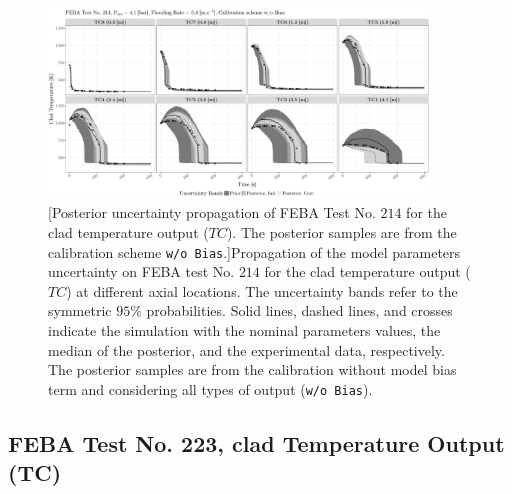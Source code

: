 \clearpage
\begin{figure}
	\centering
	\includegraphics[width=0.90\textwidth]{../figures/chapter5/figures/plotTraceUQPosteriorAllNoDiscNoBCTC214}
		[Posterior uncertainty propagation of FEBA Test No. $214$ for the clad temperature output ($TC$). The posterior samples are from the calibration scheme \texttt{w/o Bias}.]{Propagation of the model parameters uncertainty on FEBA test No. $214$ for the clad temperature output ($TC$) at different axial locations. The uncertainty bands refer to the symmetric $95\%$ probabilities. Solid lines, dashed lines, and crosses indicate the simulation with the nominal parameters values, the median of the posterior, and the experimental data, respectively. The posterior samples are from the calibration without model bias term and considering all types of output (\texttt{w/o Bias}).}
	\label{fig:ch5_plot_trace_uq_post_tc_214_nodisc}
\end{figure}
\clearpage

\subsection{FEBA Test No. 223, clad Temperature Output (TC)}\label{app:tbl_results_uq_post_tc_223}

